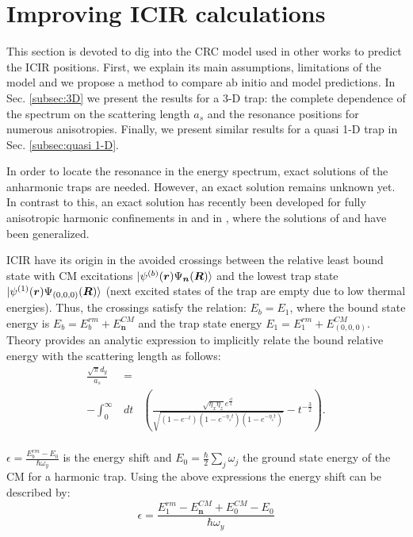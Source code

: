 \documentclass[aps,pre,twocolumn,superscriptaddress,showpacs]{revtex4-1}
\newcommand{\bfeq}[1]{{\boldsymbol{#1}}}
\begin{document}
\section{Improving ICIR calculations}  \label{sec:theory}
This section is devoted to dig into the CRC model used in other works to predict the ICIR positions. First, we explain its main assumptions, limitations of the model and we propose a
method to compare ab initio and model predictions. In Sec. \ref{subsec:3D} we present the results for a 3-D trap: the complete dependence of the spectrum on the scattering length $a_s$ and
the resonance positions for numerous anisotropies. Finally, we present similar results for a quasi 1-D trap in Sec. \ref{subsec:quasi 1-D}.
	
In order to locate the resonance in the energy spectrum, exact solutions of the anharmonic traps are needed. However, an exact solution remains unknown yet. In contrast to this, an exact solution
has recently been developed for fully anisotropic harmonic confinements in \cite{PhysRevA.101.053624} and in \cite{PhysRevA.102.013314}, where the solutions of \cite{PhysRevA.74.022712} and
 \cite{Liang_2008} have been generalized. 
	
ICIR have its origin in the avoided crossings between the relative least bound state with CM excitations $\ket{\psi^{(b)}(\bfeq{r}) \Psi_{\bfeq{n}} (\bfeq{R})}$ and the lowest trap state
$\ket{\psi^{(1)}(\bfeq{r}) \Psi_{(0,0,0)} (\bfeq{R})}$ (next excited states of the trap are empty due to low thermal energies).  Thus, the crossings satisfy the relation: $E_b = E_1$, where the 
bound state energy is $E_b = E^{rm}_b + E^{CM}_{\bfeq{n}}$ and the trap state energy $E_1 = E^{rm}_1 + E^{CM}_{(0,0,0)}$. Theory provides an analytic expression to implicitly relate the
bound relative energy with the scattering length as follows:
\begin{eqnarray}
\frac{\sqrt{\pi} d_y}{a_s} &=& \nonumber \\
 - \int^\infty_0 &dt& \left( \frac{\sqrt{\eta_x \eta_z} e^{\frac{\epsilon t}{2}}}{\sqrt{(1 - e^{-t}) (1 - e^{-\eta_x t}) (1 - e^{-\eta_z t})} } - t^{-\frac{3}{2}}\right). \nonumber \\
\label{eq:ascE}
\end{eqnarray}
	
$\epsilon = \frac{E^{rm}_b - E_0}{\hbar \omega_y}$ is the energy shift and $E_0 = \frac{\hbar}{2}\sum_j \omega_j $ the ground state energy of the CM for a harmonic trap. Using the above
expressions the energy shift can be described by:
\begin{equation}
\epsilon = \frac{E^{rm}_1 - E^{CM}_{\bfeq{n}} + E^{CM}_0 - E_0}{\hbar \omega_y}
\label{eq:Energy shift}
\end{equation}
	
\end{document}
